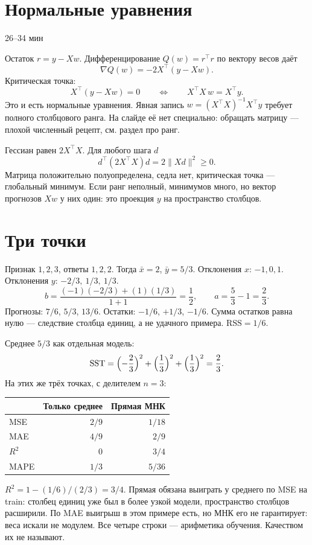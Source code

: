 \documentclass[11pt,a4paper]{article}
\newcommand{\timing}[1]{\hfill{\small\color{blue}#1}}
\begin{document}
\section{Нормальные уравнения}

\timing{26--34 мин}

Остаток \(r=y-Xw\). Дифференцирование \(Q(w)=r^{\top}r\) по вектору весов даёт
\[
\nabla Q(w)=-2X^{\top}(y-Xw).
\]
Критическая точка:
\[
X^{\top}(y-Xw)=0\qquad\Leftrightarrow\qquad X^{\top}X\,w=X^{\top}y.
\]
Это и есть нормальные уравнения. Явная запись \(w=(X^{\top}X)^{-1}X^{\top}y\) требует полного столбцового ранга. На слайде её нет специально: обращать матрицу --- плохой численный рецепт, см. раздел про ранг.

Гессиан равен \(2X^{\top}X\). Для любого шага \(d\)
\[
d^{\top}(2X^{\top}X)d=2\|Xd\|^{2}\ge 0.
\]
Матрица положительно полуопределена, седла нет, критическая точка --- глобальный минимум. Если ранг неполный, минимумов много, но вектор прогнозов \(Xw\) у них один: это проекция \(y\) на пространство столбцов.

\section{Три точки}

Признак \(1,2,3\), ответы \(1,2,2\). Тогда \(\bar x=2\), \(\bar y=5/3\). Отклонения \(x\): \(-1,0,1\). Отклонения \(y\): \(-2/3,\ 1/3,\ 1/3\).
\[
b=\frac{(-1)(-2/3)+(1)(1/3)}{1+1}=\frac{1}{2},\qquad a=\frac{5}{3}-1=\frac{2}{3}.
\]
Прогнозы: \(7/6\), \(5/3\), \(13/6\). Остатки: \(-1/6\), \(+1/3\), \(-1/6\). Сумма остатков равна нулю --- следствие столбца единиц, а не удачного примера. \(\mathrm{RSS}=1/6\).

Среднее \(5/3\) как отдельная модель:
\[
\mathrm{SST}=\Bigl(-\frac{2}{3}\Bigr)^{2}+\Bigl(\frac{1}{3}\Bigr)^{2}+\Bigl(\frac{1}{3}\Bigr)^{2}=\frac{2}{3}.
\]
На этих же трёх точках, с делителем \(n=3\):

{\small\begin{tabular}{@{}lrr@{}}
\toprule
& Только среднее & Прямая МНК\\
\midrule
MSE & \(2/9\) & \(1/18\)\\
MAE & \(4/9\) & \(2/9\)\\
\(R^{2}\) & \(0\) & \(3/4\)\\
MAPE & \(1/3\) & \(5/36\)\\
\bottomrule
\end{tabular}}

\(R^{2}=1-(1/6)/(2/3)=3/4\). Прямая обязана выиграть у среднего по MSE на train: столбец единиц уже был в более узкой модели, пространство столбцов расширили. По MAE выигрыш в этом примере есть, но МНК его не гарантирует: веса искали не модулем. Все четыре строки --- арифметика обучения. Качеством их не называют.
\end{document}
